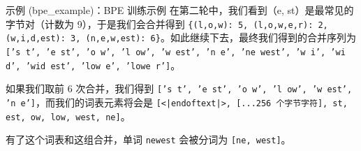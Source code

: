 \begin{problembox}{示例 (bpe\_example)：BPE 训练示例}
在第二轮中，我们看到（e, st）是最常见的字节对（计数为 9），于是我们会合并得到 \texttt{\{(l,o,w): 5, (l,o,w,e,r): 2, (w,i,d,est): 3, (n,e,w,est): 6\}}。如此继续下去，最终我们得到的合并序列为 \texttt{['s t', 'e st', 'o w', 'l ow', 'w est', 'n e', 'ne west', 'w i', 'wi d', 'wid est', 'low e', 'lowe r']}。

如果我们取前 6 次合并，我们得到 \texttt{['s t', 'e st', 'o w', 'l ow', 'w est', 'n e']}，而我们的词表元素将会是 \texttt{[<|endoftext|>, [...256 个字节字符], st, est, ow, low, west, ne]}。

有了这个词表和这组合并，单词 \texttt{newest} 会被分词为 \texttt{[ne, west]}。
\end{problembox}
